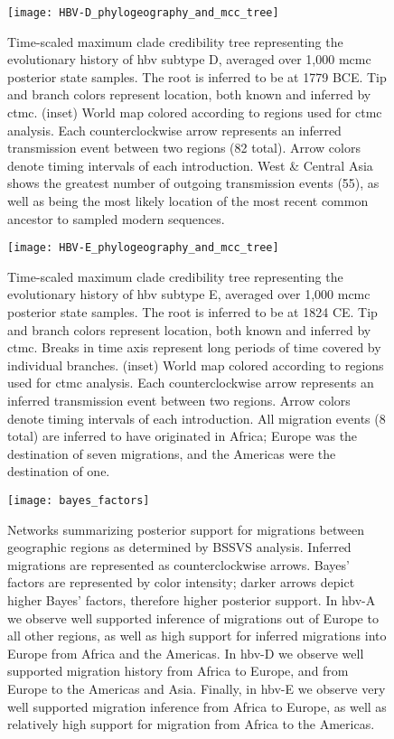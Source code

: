\begin{figure}[ht]
  \centering
  \medskip
  \texttt{[image: HBV-D\_phylogeography\_and\_mcc\_tree]}
  \caption[HBV-D Phylogeography]{Time-scaled maximum clade credibility tree representing the evolutionary history of \gls{hbv} subtype D, averaged over 1,000 \gls{mcmc} posterior state samples. The root is inferred to be at 1779 BCE. Tip and branch colors represent location, both known and inferred by \gls{ctmc}. (inset) World map colored according to regions used for \gls{ctmc} analysis. Each counterclockwise arrow represents an inferred transmission event between two regions (82 total). Arrow colors denote timing intervals of each introduction. West \& Central Asia shows the greatest number of outgoing transmission events (55), as well as being the most likely location of the most recent common ancestor to sampled modern sequences.}
  \label{fig:HBV-D_phylogeo}
\end{figure}

\begin{figure}[ht]
  \centering
  \medskip
  \texttt{[image: HBV-E\_phylogeography\_and\_mcc\_tree]}
  \caption[HBV-E Phylogeography]{Time-scaled maximum clade credibility tree representing the evolutionary history of \gls{hbv} subtype E, averaged over 1,000 \gls{mcmc} posterior state samples. The root is inferred to be at 1824 CE. Tip and branch colors represent location, both known and inferred by \gls{ctmc}. Breaks in time axis represent long periods of time covered by individual branches. (inset) World map colored according to regions used for \gls{ctmc} analysis. Each counterclockwise arrow represents an inferred transmission event between two regions. Arrow colors denote timing intervals of each introduction. All migration events (8 total) are inferred to have originated in Africa; Europe was the destination of seven migrations, and the Americas were the destination of one.}
  \label{fig:HBV-E_phylogeo}
\end{figure}

\begin{figure}[ht]
  \centering
  \medskip
  \texttt{[image: bayes\_factors]}
  \caption[Bayes' factors of \gls{hbv} geographic transitions]{Networks summarizing posterior support for migrations between geographic regions as determined by BSSVS analysis. Inferred migrations are represented as counterclockwise arrows. Bayes' factors are represented by color intensity; darker arrows depict higher Bayes' factors, therefore higher posterior support. In \gls{hbv}-A we observe well supported inference of migrations out of Europe to all other regions, as well as high support for inferred migrations into Europe from Africa and the Americas. In \gls{hbv}-D we observe well supported migration history from Africa to Europe, and from Europe to the Americas and Asia. Finally, in \gls{hbv}-E we observe very well supported migration inference from Africa to Europe, as well as relatively high support for migration from Africa to the Americas.}
  \label{fig:bayes_factors}
\end{figure}

